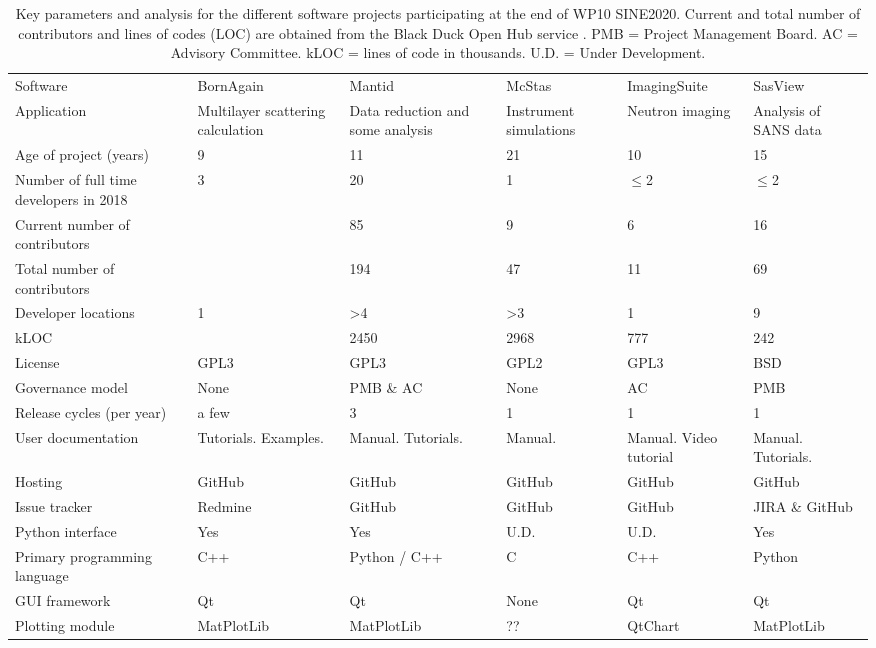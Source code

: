 \documentclass[jnr]{iosart2x}
\begin{document}
\begin{table}
 \begin{tabular}{llllll}
 Software                        & BornAgain \cite{bornagain}  & Mantid \cite{mantid} & McStas \cite{mcstas}  & ImagingSuite \cite{ImagingSuite} & SasView \cite{sasview} \\
 Application                     & Multilayer scattering calculation & Data reduction and some analysis & Instrument simulations & Neutron imaging & Analysis of SANS data \\
 Age of project (years)          & 9 & 11 & 21 & 10 & 15 \\
 Number of full time developers in 2018 & 3 & 20 & 1 & $\le$2 & $\le$2 \\
 Current number of contributors  &  & 85  & 9 & 6 & 16 \\
 Total number of contributors    &  & 194 & 47 & 11 & 69 \\
 Developer locations             & 1 & >4 & >3 & 1 & 9 \\
 kLOC &  & 2450 & 2968 & 777 & 242 \\
 License                         & GPL3 & GPL3 & GPL2 & GPL3 & BSD \\
 Governance model                & None & PMB \& AC  & None & AC & PMB \\
 Release cycles (per year)       & a few & 3 & 1 & 1 & 1\\
 User documentation              & Tutorials. Examples. & Manual. Tutorials. & Manual. & Manual. Video tutorial & Manual. Tutorials. \\
 Hosting         & GitHub & GitHub & GitHub & GitHub & GitHub \\
 Issue tracker   & Redmine & GitHub & GitHub & GitHub & JIRA \& GitHub \\
 Python interface & Yes & Yes & U.D. & U.D. & Yes \\
 Primary programming language & C++ & Python / C++ & C & C++ & Python \\
 GUI framework    & Qt & Qt & None & Qt & Qt \\  
 Plotting module & MatPlotLib & MatPlotLib & ?? & QtChart & MatPlotLib \\ 
 \end{tabular}
 \caption{Key parameters and analysis for the different software projects participating at the end of WP10 SINE2020. 
 Current and total number of contributors and lines of codes (LOC) are obtained from the Black Duck Open Hub service \cite{BlackDuck}.
PMB = Project Management Board. 
AC = Advisory Committee.
kLOC = lines of code in thousands.
U.D. = Under Development.}
\label{summaryTable}
\end{table}
\end{document}
